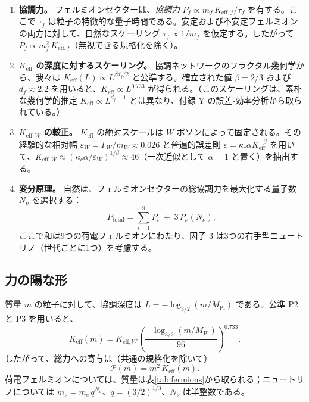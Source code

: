 \documentclass[12pt,a4paper]{article}
\begin{document}
	\begin{enumerate}[label=\textbf{P\arabic*}:, leftmargin=*]
		\item \textbf{協調力。} フェルミオンセクターは、\textit{協調力} \(P_f \propto m_f \, K_{\mathrm{eff},f}/\tau_f\) を有する。ここで \(\tau_f\) は粒子の特徴的な量子時間である。安定および不安定フェルミオンの両方に対して、自然なスケーリング \(\tau_f \propto 1/m_f\) を仮定する。したがって \(P_f \propto m_f^2 \, K_{\mathrm{eff},f}\)（無視できる規格化を除く）。
		\item \textbf{\(K_{\mathrm{eff}}\) の深度に対するスケーリング。} 協調ネットワークのフラクタル幾何学から、我々は \(K_{\mathrm{eff}}(L) \propto L^{\beta d_f/2}\) と公準する。確立された値 \(\beta=2/3\) および \(d_f\approx2.2\) を用いると、\(K_{\mathrm{eff}} \propto L^{0.733}\) が得られる。（このスケーリングは、素朴な幾何学的推定 \(K_{\mathrm{eff}}\propto L^{d_f-1}\) とは異なり、付録 Y の誤差‐効率分析から取られている。）
		\item \textbf{\(K_{\mathrm{eff},W}\) の較正。} \(K_{\mathrm{eff}}\) の絶対スケールは \(W\) ボソンによって固定される。その経験的な相対幅 \(\varepsilon_W = \Gamma_W/m_W \approx 0.026\) と普遍的誤差則 \(\varepsilon = \kappa_c \alpha K_{\mathrm{eff}}^{-\beta}\) を用いて、\(K_{\mathrm{eff},W} \approx (\kappa_c \alpha / \varepsilon_W)^{1/\beta} \approx 46\)（一次近似として \(\alpha=1\) と置く）を抽出する。
		\item \textbf{変分原理。} 自然は、フェルミオンセクターの総協調力を最大化する量子数 \(N_{\nu}\) を選択する：
		\begin{equation}
			P_{\mathrm{total}} = \sum_{i=1}^{9} P_i \;+\; 3\,P_{\nu}(N_{\nu}),
		\end{equation}
		ここで和は9つの荷電フェルミオンにわたり、因子 \(3\) は3つの右手型ニュートリノ（世代ごとに1つ）を考慮する。
	\end{enumerate}
	
	\subsection{力の陽な形}
	
	質量 \(m\) の粒子に対して、協調深度は \(L = -\log_{3/2}(m/M_{\mathrm{Pl}})\) である。公準 P2 と P3 を用いると、
	\begin{equation}
		K_{\mathrm{eff}}(m) = K_{\mathrm{eff},W} \left( \frac{-\log_{3/2}(m/M_{\mathrm{Pl}})}{96} \right)^{0.733}.
	\end{equation}
	したがって、総力への寄与は（共通の規格化を除いて）
	\begin{equation}
		\mathcal{P}(m) = m^2 \, K_{\mathrm{eff}}(m).
	\end{equation}
	荷電フェルミオンについては、質量は表\ref{tab:fermions}から取られる；ニュートリノについては \(m_{\nu} = m_e \, q^{N_{\nu}}\)、\(q=(3/2)^{1/3}\)、\(N_{\nu}\) は半整数である。
	
\end{document}
